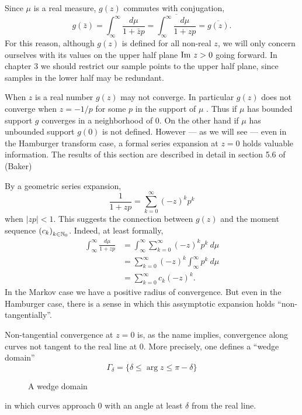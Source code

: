 \begin{remark}
  Since $\mu$ is a real measure, $g(z)$ commutes with conjugation,
  \[
    g(\bar z) = \int_\infty^\infty\frac{d\mu}{1+\bar zp} = \overline{\int_\infty^\infty\frac{d\mu}{1+zp}} = \overline{g(z)}.
  \]
  For this reason, although $g(z)$ is defined for all non-real $z$, we will only concern ourselves with its values on the upper half plane $\text{Im}~ z > 0$ going forward. In chapter 3 we should restrict our sample points to the upper half plane, since samples in the lower half may be redundant.
\end{remark}


When $z$ is a real number $g(z)$ may not converge. In particular $g(z)$ does not converge when $z = -1/p$ for some $p$ in the support of $\mu$ \pn.  Thus if $\mu$ has bounded support $g$ converges in a neighborhood of $0$. On the other hand if $\mu$ has unbounded support $g(0)$ is not defined. However — as we will see — even in the Hamburger transform case, a formal series expansion at $z = 0$ holds valuable information. The results of this section are described in detail in section 5.6 of (Baker) \cn

By a geometric series expansion,
\[
  \frac1{1 + zp} = \sum_{k = 0}^\infty {(-z)}^k p^k 
\]
when $|zp| < 1$. This suggests the connection between $g(z)$ and the moment sequence ${(c_k)}_{k \in \mathbb{N}_0}$. Indeed, at least formally,
\begin{align*}
  \int_\infty^\infty\frac{d\mu}{1+zp}
  &= \int_\infty^\infty \sum_{k = 0}^\infty {(-z)}^k p^k ~d\mu \\
  &= \sum_{k = 0}^\infty {(-z)}^k \int_\infty^\infty p^k ~d\mu \\
  &= \sum_{k = 0}^\infty c_k{(-z)}^k.
\end{align*}
In the Markov case we have a positive radius of convergence. But even in the Hamburger case, there is a sense in which this assymptotic expansion holds ``non-tangentially''.

Non-tangential convergence at $z = 0$ is, as the name implies, convergence along curves not tangent to the real line at $0$. More precisely, one defines a ``wedge domain''
\[
  \Gamma_\delta = \{\delta \leq \arg z \leq \pi - \delta\}
\]
\begin{figure}
  \centering
  \caption{A wedge domain}\label{fig:wedge}
\end{figure}
in which curves approach $0$ with an angle at least $\delta$ from the real line.


